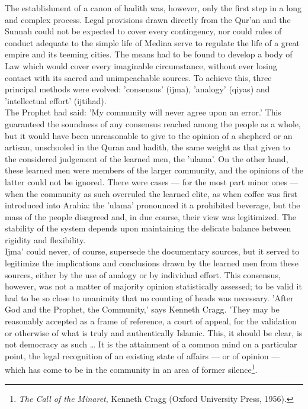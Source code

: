 \documentclass[11pt, b5paper, twoside]{book}
\begin{document}
The establishment of a canon of hadith was, however, only the first step in a long and complex 
process. Legal provisions drawn directly from the Qur'an and the Sunnah could not be expected to 
cover every contingency, nor could rules of conduct adequate to the simple life of Medina serve to 
regulate the life of a great empire and its teeming cities. The means had to be found to develop a 
body of Law which would cover every imaginable circumstance, without ever losing contact with its 
sacred and unimpeachable sources. To achieve this, three principal methods were evolved: 'consensus' 
(ijma), 'analogy' (qiyas) and 'intellectual effort' (ijtihad). \\

The Prophet had said: 'My community will never agree upon an error.' This guaranteed the soundness of 
any consensus reached among the people as a whole, but it would have been unreasonable to give to the 
opinion of a shepherd or an artisan, unschooled in the Quran and hadith, the same weight as that 
given to the considered judgement of the learned men, the 'ulama'. On the other hand, these learned 
men were members of the larger community, and the opinions of the latter could not be ignored. There 
were cases --- for the most part minor ones --- when the community as such overruled the learned elite, 
as when coffee was first introduced into Arabia: the 'ulama' pronounced it a prohibited beverage, but 
the mass of the people disagreed and, in due course, their view was legitimized. The stability of the 
system depends upon maintaining the delicate balance between rigidity and flexibility. \\

Ijma' could never, of course, supersede the documentary sources, but it served to legitimize the 
implications and conclusions drawn by the learned men from these sources, either by the use of 
analogy or by individual effort. This consensus, however, was not a matter of majority opinion 
statistically assessed; to be valid it had to be so close to unanimity that no counting of heads was 
necessary. 'After God and the Prophet, the Community,' says Kenneth Cragg. 'They may be reasonably 
accepted as a frame of reference, a court of appeal, for the validation or otherwise of what is truly 
and authentically Islamic. This, it should be clear, is not democracy as such \ldots{} It is the 
attainment of a common mind on a particular point, the legal recognition of an existing state of 
affairs --- or of opinion --- which has come to be in the community in an area of former silence\footnote{\emph{The Call of the Minaret}, Kenneth Cragg (Oxford University Press, 1956).}. \\
\end{document}
